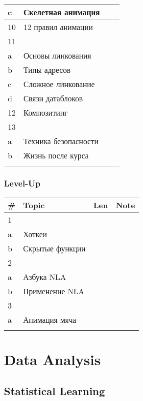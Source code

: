\documentclass[a4paper,12pt]{article} %
\begin{document}
\begin{longtable}{|l|p{11cm}|l|l|}
	c & Скелетная анимация &  &  \\
	\hline
	10 & 12 правил анимации &  &  \\
	\hline
	11 &  &  &  \\
	a & Основы линкования &  &  \\
	b & Типы адресов &  &  \\
	c & Сложное линкование &  &  \\
	d & Связи датаблоков &  &  \\
	\hline
	12 & Композитинг &  &  \\
	\hline
	13 &  &  &  \\
	a & Техника безопасности &  &  \\
	b & Жизнь после курса &  &  \\
	\hline
	&  &  &  \\
	\hline
\end{longtable}

\subsubsection{Level-Up}
\begin{longtable}{|l|p{11cm}|l|l|}
	\hline
	\# & Topic & Len & Note \\
	\hline
	1 &  &  &  \\
	a & Хоткеи &  &  \\
	b & Скрытые функции &  &  \\
	\hline
	2 &  &  &  \\
	a & Азбука NLA &  &  \\
	b & Применение NLA &  &  \\
	\hline
	3 &  &  &  \\
	a & Анимация мяча &  &  \\
	\hline
	&  &  &  \\
	\hline
\end{longtable}


\newpage
\section{Data Analysis}

\subsection{Statistical Learning}
\end{document}
